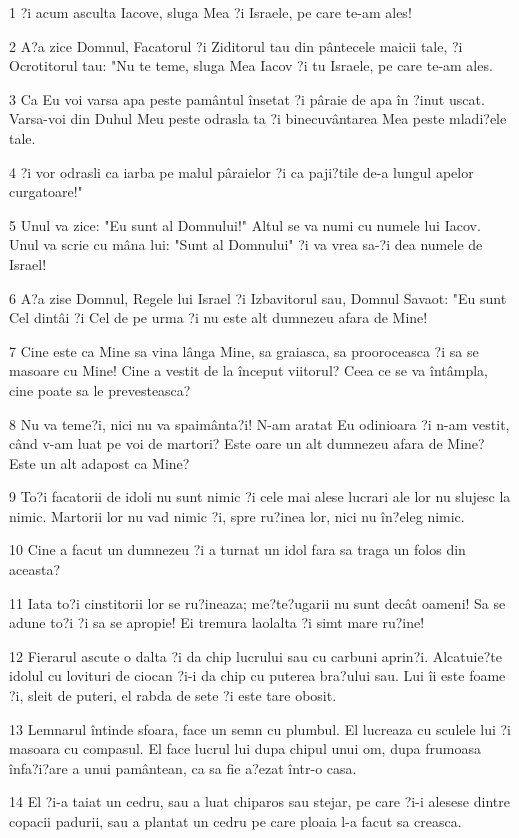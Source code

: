\par 1 ?i acum asculta Iacove, sluga Mea ?i Israele, pe care te-am ales!
\par 2 A?a zice Domnul, Facatorul ?i Ziditorul tau din pântecele maicii tale, ?i Ocrotitorul tau: "Nu te teme, sluga Mea Iacov ?i tu Israele, pe care te-am ales.
\par 3 Ca Eu voi varsa apa peste pamântul însetat ?i pâraie de apa în ?inut uscat. Varsa-voi din Duhul Meu peste odrasla ta ?i binecuvântarea Mea peste mladi?ele tale.
\par 4 ?i vor odrasli ca iarba pe malul pâraielor ?i ca paji?tile de-a lungul apelor curgatoare!"
\par 5 Unul va zice: "Eu sunt al Domnului!" Altul se va numi cu numele lui Iacov. Unul va scrie cu mâna lui: "Sunt al Domnului" ?i va vrea sa-?i dea numele de Israel!
\par 6 A?a zise Domnul, Regele lui Israel ?i Izbavitorul sau, Domnul Savaot: "Eu sunt Cel dintâi ?i Cel de pe urma ?i nu este alt dumnezeu afara de Mine!
\par 7 Cine este ca Mine sa vina lânga Mine, sa graiasca, sa prooroceasca ?i sa se masoare cu Mine! Cine a vestit de la început viitorul? Ceea ce se va întâmpla, cine poate sa le prevesteasca?
\par 8 Nu va teme?i, nici nu va spaimânta?i! N-am aratat Eu odinioara ?i n-am vestit, când v-am luat pe voi de martori? Este oare un alt dumnezeu afara de Mine? Este un alt adapost ca Mine?
\par 9 To?i facatorii de idoli nu sunt nimic ?i cele mai alese lucrari ale lor nu slujesc la nimic. Martorii lor nu vad nimic ?i, spre ru?inea lor, nici nu în?eleg nimic.
\par 10 Cine a facut un dumnezeu ?i a turnat un idol fara sa traga un folos din aceasta?
\par 11 Iata to?i cinstitorii lor se ru?ineaza; me?te?ugarii nu sunt decât oameni! Sa se adune to?i ?i sa se apropie! Ei tremura laolalta ?i simt mare ru?ine!
\par 12 Fierarul ascute o dalta ?i da chip lucrului sau cu carbuni aprin?i. Alcatuie?te idolul cu lovituri de ciocan ?i-i da chip cu puterea bra?ului sau. Lui îi este foame ?i, sleit de puteri, el rabda de sete ?i este tare obosit.
\par 13 Lemnarul întinde sfoara, face un semn cu plumbul. El lucreaza cu sculele lui ?i masoara cu compasul. El face lucrul lui dupa chipul unui om, dupa frumoasa înfa?i?are a unui pamântean, ca sa fie a?ezat într-o casa.
\par 14 El ?i-a taiat un cedru, sau a luat chiparos sau stejar, pe care ?i-i alesese dintre copacii padurii, sau a plantat un cedru pe care ploaia l-a facut sa creasca.
